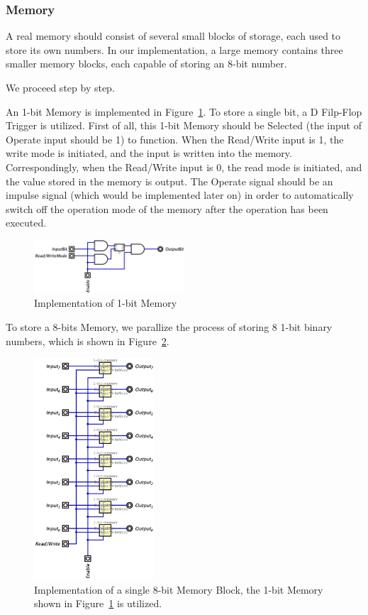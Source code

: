 \documentclass[conference]{IEEEtran}
\begin{document}
\subsubsection{Memory}



A real memory should consist of several small blocks of storage, each used to store its own numbers. In our implementation, a large memory contains three smaller memory blocks, each capable of storing an 8-bit number.

We proceed step by step.

An 1-bit Memory is implemented in Figure~\ref{fig:1-bit-memory}. To store a single bit, a D Filp-Flop Trigger is utilized. First of all, this 1-bit Memory should be Selected (the input of Operate input should be 1) to function.
When the Read/Write input is 1, the write mode is initiated, and the input is written into the memory. Correspondingly, when the Read/Write input is 0, the read mode is initiated, and the value stored in the memory is output.
The Operate signal should be an impulse signal (which would be implemented later on) in order to automatically switch off the operation mode of the memory after the operation has been executed.

\begin{figure}[h!]
    \centering
    \includegraphics[width=0.5\textwidth]{assets/1-bit-memory.png}
    \caption{Implementation of 1-bit Memory}
    \label{fig:1-bit-memory}
\end{figure}

To store a 8-bits Memory, we parallize the process of storing 8 1-bit binary numbers, which is shown in Figure~\ref{fig:8-bits-memory}.

\begin{figure}[h!]
    \centering
    \includegraphics[width=0.4\textwidth]{assets/8-bit-memory.png}
    \caption{Implementation of a single 8-bit Memory Block, the 1-bit Memory shown in Figure~\ref{fig:1-bit-memory} is utilized.}
    \label{fig:8-bits-memory}
\end{figure}
\end{document}
